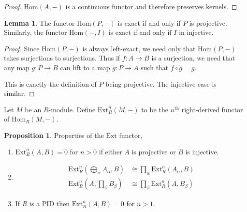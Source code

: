 \documentclass[12pt]{article}
\newcommand{\Ext}[4]{\mathrm{Ext}^{#1}_{#2} \left( #3, #4 \right)}
\newcommand{\Homover}[3]{\mathrm{Hom}_{#1} \left( #2, #3 \right)}
\newcommand{\Hom}[2]{\mathrm{Hom}\left(#1, #2 \right)}
\theoremstyle{remark}
\theoremstyle{definition}
\newtheorem{lemma}[theorem]{Lemma}
\newtheorem{proposition}[theorem]{Proposition}
\newenvironment{definition}[1][Definition:]{\begin{trivlist}
\item[\hskip \labelsep {\bfseries #1}]}{\end{trivlist}}
\begin{document}
\begin{proof}
$\Hom{A}{-}$ is a continuous functor and therefore preserves kernels. 
\end{proof}

\begin{lemma}
The functor $\Hom{P}{-}$ is exact if and only if $P$ is projective. Similarly, the functor $\Hom{-}{I}$ is exact if and only if $I$ in injective.
\end{lemma}

\begin{proof}
Since $\Hom{P}{-}$ is always left-exact, we need only that $\Hom{P}{-}$ takes surjections to surjections. Thus if $f : A \to B$ is a surjection, we need that any map $g : P \to B$ can lift to a map $\tilde{g} : P \to A$ such that $f \circ \tilde{g} = g$.
\begin{center}
\end{center} 
This is exactly the definition of $P$ being projective. The injective case is similar.
\end{proof}


\begin{definition}
Let $M$ be an $R$-module. Define $\Ext{n}{R}{M}{-}$ to be the $n^{\mathrm{th}}$ right-derived functor of $\Homover{R}{M}{-}$. 
\end{definition}

\begin{proposition}
Properties of the $\mathrm{Ext}$ functor,
\begin{enumerate}
\item $\Ext{n}{R}{A}{B} = 0$ for $n > 0$ if either $A$ is projective or $B$ is injective.
\item 
\begin{align*}
\Ext{n}{R}{\bigoplus_\alpha A_{\alpha}}{B} & \cong \prod_\alpha \Ext{n}{R}{A_{\alpha}}{B} 
\\
\Ext{n}{R}{A}{\prod_{\beta} B_{\beta}} & \cong \prod_{\beta} \Ext{n}{R}{A}{B_{\beta}} 
\end{align*} 
\item If $R$ is a PID then $\Ext{n}{R}{A}{B} = 0$ for $n > 1$. 
\end{enumerate}
\end{proposition}
\end{document}
